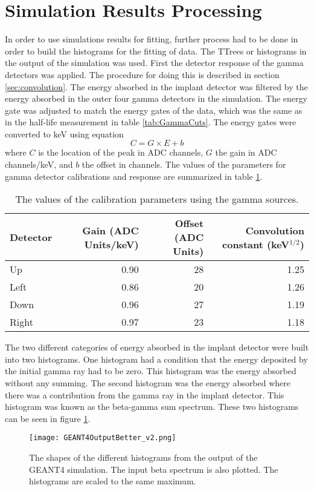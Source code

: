 \documentclass[../MaxHughesThesis.tex]{subfiles}
\begin{document}
\section{Simulation Results Processing}
In order to use simulations results for fitting, further process had to be done in order to build the histograms for the fitting of data.
The TTrees or histograms in the output of the simulation was used.
First the detector response of the gamma detectors was applied.
The procedure for doing this is described in section \ref{sec:convolution}.
The energy absorbed in the implant detector was filtered by the energy absorbed in the outer four gamma detectors in the simulation.
The energy gate was adjusted to match the energy gates of the data, which was the same as in the half-life measurement in table \ref{tab:GammaCuts}.
The energy gates were converted to keV using equation
\begin{equation}
        C = G \times E + b
        \label{eq:cal}
\end{equation}
where $C$ is the location of the peak in ADC channels, $G$ the gain in ADC channels/keV, and $b$ the offset in channels.
The values of the parameters for gamma detector calibrations and response are summarized in table \ref{tab:gammadetcal}.

\begin{table}[!hbt]
        \centering
        \caption{The values of the calibration parameters using the gamma sources.}
                \begin{tabular}{lrrr} \hline \hline
                Detector & Gain (ADC Units/keV) & Offset (ADC Units) & Convolution constant (keV$^{1/2}$) \\ \hline
                Up & 0.90 & 28 & 1.25\\
                Left & 0.86 & 20 & 1.26 \\
                Down & 0.96 & 27 & 1.19\\
                Right & 0.97 & 23 & 1.18\\ \hline \hline 
                \end{tabular}
                \label{tab:gammadetcal}
\end{table}
The two different categories of energy absorbed in the implant detector were built into two histograms.
One histogram had a condition that the energy deposited by the initial gamma ray had to be zero.
This histogram was the energy absorbed without any summing.
The second histogram was the energy absorbed where there was a contribution from the gamma ray in the implant detector.
This histogram was known as the beta-gamma sum spectrum.
These two histograms can be seen in figure \ref{fig:GEANT4Hists}.
\begin{figure}[!htb]
        \centerline{\texttt{[image: GEANT4OutputBetter\_v2.png]}}
        \caption{The shapes of the different histograms from the output of the GEANT4 simulation.
                 The input beta spectrum is also plotted.
                 The histograms are scaled to the same maximum.}
        \label{fig:GEANT4Hists}
\end{figure}
\end{document}
